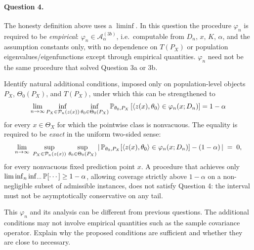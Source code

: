 \documentclass{article}
\begin{document}
\paragraph{Question 4.}
The honesty definition above uses a \(\liminf\). In this question the
procedure \(\varphi_n\) is required to be \emph{empirical}:
\(\varphi_n\in\mathcal A_\alpha^{(3b)}\), i.e.\ computable from \(D_n\),
\(x\), \(K\), \(\alpha\), and the assumption constants only, with no
dependence on \(T(P_X)\) or population eigenvalues/eigenfunctions
except through empirical quantities. \(\varphi_n\) need not be the
same procedure that solved Question 3a or 3b.

Identify natural additional conditions, imposed only on
population-level objects \(P_X\), \(\Theta_0(P_X)\), and \(T(P_X)\),
under which this can be strengthened to
\[
  \lim_{n\to\infty}
  \inf_{P_X\in\mathcal P_n(z(x))}
  \inf_{\theta_0\in\Theta_0(P_X)}
  \mathbb{P}_{\theta_0,P_X}
  \left[
    \langle z(x),\theta_0\rangle\in\varphi_n(x;D_n)
  \right]
  =
  1-\alpha
\]
for every \(x\in\Theta_X\) for which the pointwise class is nonvacuous.
The equality is required to be \emph{exact} in the uniform two-sided
sense:
\[
  \lim_{n\to\infty}\
  \sup_{P_X\in\mathcal P_n(z(x))}\,\sup_{\theta_0\in\Theta_0(P_X)}
  \left|\,
    \mathbb{P}_{\theta_0,P_X}
    \!\left[\langle z(x),\theta_0\rangle\in\varphi_n(x;D_n)\right]
    -(1-\alpha)
  \,\right|
  \;=\;0,
\]
for every nonvacuous fixed prediction point \(x\). A procedure that
achieves only \(\liminf_n\inf_{\cdots}\mathbb{P}[\cdots]\ge 1-\alpha\),
allowing coverage strictly above \(1-\alpha\) on a non-negligible
subset of admissible instances, does not satisfy Question 4: the
interval must not be asymptotically conservative on any tail.

This $\varphi_n$ and its analysis can be different from previous questions.
The
additional conditions may not involve empirical quantities such as the sample
covariance operator. Explain why the proposed conditions are sufficient and
whether they are close to necessary.
\end{document}
